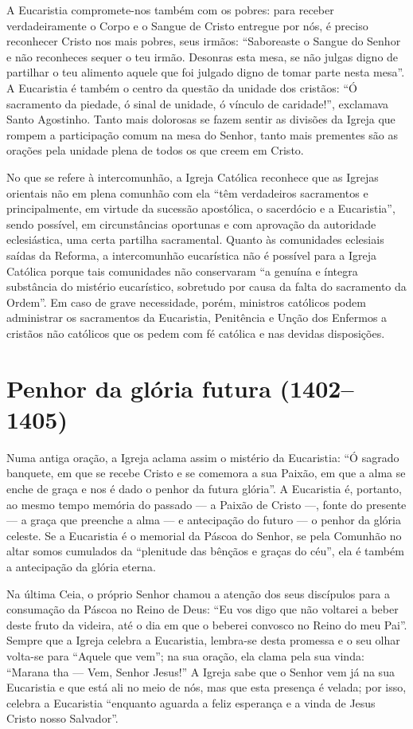 A Eucaristia compromete-nos também com os pobres: para receber verdadeiramente o Corpo e o Sangue de Cristo entregue por nós, é preciso reconhecer Cristo nos mais pobres, seus irmãos: ``Saboreaste o Sangue do Senhor e não reconheces sequer o teu irmão. Desonras esta mesa, se não julgas digno de partilhar o teu alimento aquele que foi julgado digno de tomar parte nesta mesa''. A Eucaristia é também o centro da questão da unidade dos cristãos: ``Ó sacramento da piedade, ó sinal de unidade, ó vínculo de caridade!'', exclamava Santo Agostinho. Tanto mais dolorosas se fazem sentir as divisões da Igreja que rompem a participação comum na mesa do Senhor, tanto mais prementes são as orações pela unidade plena de todos os que creem em Cristo.

No que se refere à intercomunhão, a Igreja Católica reconhece que as Igrejas orientais não em plena comunhão com ela ``têm verdadeiros sacramentos e principalmente, em virtude da sucessão apostólica, o sacerdócio e a Eucaristia'', sendo possível, em circunstâncias oportunas e com aprovação da autoridade eclesiástica, uma certa partilha sacramental. Quanto às comunidades eclesiais saídas da Reforma, a intercomunhão eucarística não é possível para a Igreja Católica porque tais comunidades não conservaram ``a genuína e íntegra substância do mistério eucarístico, sobretudo por causa da falta do sacramento da Ordem''. Em caso de grave necessidade, porém, ministros católicos podem administrar os sacramentos da Eucaristia, Penitência e Unção dos Enfermos a cristãos não católicos que os pedem com fé católica e nas devidas disposições.

\section{Penhor da glória futura (1402--1405)}

Numa antiga oração, a Igreja aclama assim o mistério da Eucaristia: ``Ó sagrado banquete, em que se recebe Cristo e se comemora a sua Paixão, em que a alma se enche de graça e nos é dado o penhor da futura glória''. A Eucaristia é, portanto, ao mesmo tempo memória do passado --- a Paixão de Cristo ---, fonte do presente --- a graça que preenche a alma --- e antecipação do futuro --- o penhor da glória celeste. Se a Eucaristia é o memorial da Páscoa do Senhor, se pela Comunhão no altar somos cumulados da ``plenitude das bênçãos e graças do céu'', ela é também a antecipação da glória eterna.

Na última Ceia, o próprio Senhor chamou a atenção dos seus discípulos para a consumação da Páscoa no Reino de Deus: ``Eu vos digo que não voltarei a beber deste fruto da videira, até o dia em que o beberei convosco no Reino do meu Pai''. Sempre que a Igreja celebra a Eucaristia, lembra-se desta promessa e o seu olhar volta-se para ``Aquele que vem''; na sua oração, ela clama pela sua vinda: ``Marana tha --- Vem, Senhor Jesus!'' A Igreja sabe que o Senhor vem já na sua Eucaristia e que está ali no meio de nós, mas que esta presença é velada; por isso, celebra a Eucaristia ``enquanto aguarda a feliz esperança e a vinda de Jesus Cristo nosso Salvador''.


